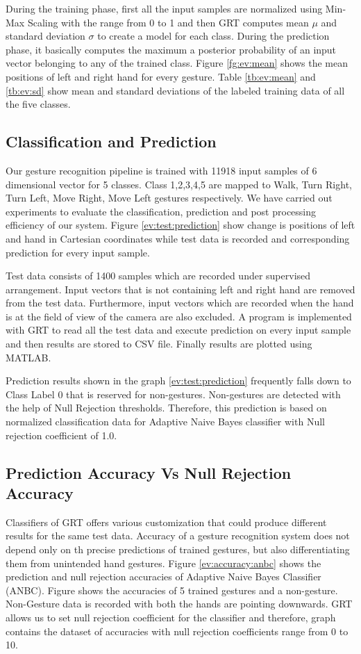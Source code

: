 During the training phase, first all the input samples are normalized using Min-Max Scaling with the range from 0 to 1 and then GRT computes mean $\mu$ and standard deviation $\sigma$ to create a model for each class. During the prediction phase, it basically computes the maximum a posterior probability of an input vector belonging to any of the trained class. Figure \ref{fg:ev:mean} shows the mean positions of left and right hand for every gesture. Table \ref{tb:ev:mean} and \ref{tb:ev:sd} show mean and standard deviations of the labeled training data of all the five classes. 

\subsection{Classification and Prediction} Our gesture recognition pipeline is trained with 11918 input samples of 6 dimensional vector for 5 classes. Class 1,2,3,4,5 are mapped to Walk, Turn Right, Turn Left, Move Right, Move Left gestures respectively. We have carried out experiments to evaluate the classification, prediction and post processing efficiency of our system. Figure \ref{ev:test:prediction} show change is positions of left and hand in Cartesian coordinates while test data is recorded and corresponding prediction for every input sample.

Test data consists of 1400 samples which are recorded under supervised arrangement. Input vectors that is not containing left and right hand are removed from the test data. Furthermore, input vectors which are recorded when the hand is at the field of view of the camera are also excluded. A program is implemented with GRT to read all the test data and execute prediction on every input sample and then results are stored to CSV file. Finally results are plotted using MATLAB.

Prediction results shown in the graph \ref{ev:test:prediction} frequently falls down to Class Label 0 that is reserved for non-gestures. Non-gestures are detected with the help of Null Rejection thresholds. Therefore, this prediction is based on normalized classification data for Adaptive Naive Bayes classifier with Null rejection coefficient of 1.0.

\subsection{Prediction Accuracy Vs Null Rejection Accuracy} \label{sec:ev:accuracy} Classifiers of GRT offers various customization that could produce different results for the same test data. Accuracy of a gesture recognition system does not depend only on th precise predictions of trained gestures, but also differentiating them from unintended hand gestures. Figure \ref{ev:accuracy:anbc} shows the prediction and null rejection accuracies of Adaptive Naive Bayes Classifier (ANBC). Figure shows the accuracies of 5 trained gestures and a non-gesture. Non-Gesture data is recorded with both the hands are pointing downwards. GRT allows us to set null rejection coefficient for the classifier and therefore, graph contains the dataset of accuracies with null rejection coefficients range from 0 to 10.

